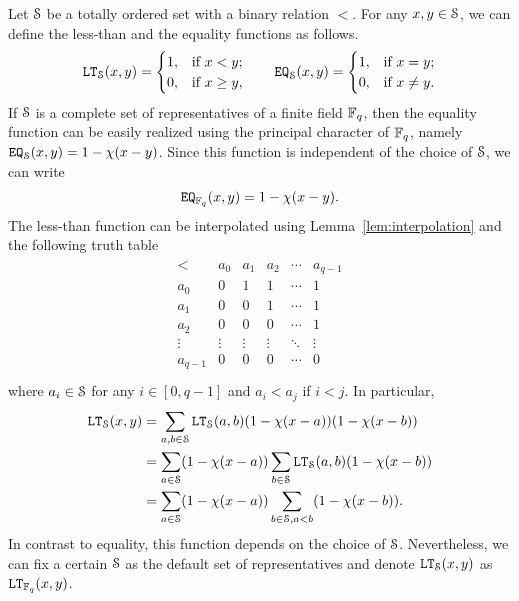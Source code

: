 Let $\S$ be a totally ordered set with a binary relation $<$.
For any $x,y \in \S$, we can define the less-than and the equality functions as follows.
\begin{align*}
  \LT_\S(x,y) = 
  \begin{cases}
    1, & \text{if } x < y; \\
    0, & \text{if } x \ge y, \\
  \end{cases}
  \qquad
  \EQ_\S(x,y) = 
  \begin{cases}
    1, & \text{if } x = y; \\
    0, & \text{if } x \neq y. \\
  \end{cases}
\end{align*}
If $\S$ is a complete set of representatives of a finite field $\F_\fieldcard$, then the equality function can be easily realized using the principal character of $\F_\fieldcard$, namely $\EQ_\S(x,y) = 1 - \princhar(x-y)$.
Since this function is independent of the choice of $\S$, we can write
\begin{align*}
  \EQ_{\F_{\fieldcard}}(x,y) = 1 - \princhar(x-y).
\end{align*}
The less-than function can be interpolated using Lemma~\ref{lem:interpolation} and the following truth table
\begin{align*}
  \begin{array}{c|ccccc}
    < & a_0 & a_1 & a_2 & \cdots & a_{q-1} \\
    \hline
    a_0 & 0 & 1 & 1 & \cdots & 1 \\
    a_1 & 0 & 0 & 1 & \cdots & 1 \\
    a_2 & 0 & 0 & 0 & \cdots & 1 \\
    \vdots & \vdots & \vdots & \vdots & \ddots & \vdots \\
    a_{q-1} & 0 & 0 & 0 & \cdots & 0 \\
  \end{array}
\end{align*}
where $a_i \in \S$ for any $i \in [0,q-1]$ and $a_i < a_j$ if $i < j$.
In particular,
\begin{align*}
  \LT_\S(x,y) &= \sum_{a,b \in \S} \LT_\S(a,b) (1-\princhar(x - a)) (1-\princhar(x - b)) \\
  &= \sum_{a \in \S} (1-\princhar(x - a)) \sum_{b \in \S} \LT_\S(a,b)  (1-\princhar(x - b)) \\
  &= \sum_{a \in \S} (1-\princhar(x - a)) \sum_{b \in \S, a < b} (1-\princhar(x - b)).
\end{align*}
In contrast to equality, this function depends on the choice of $\S$.
Nevertheless, we can fix a certain $\S$ as the default set of representatives and denote $\LT_\S(x,y)$ as $\LT_{\F_\fieldcard}(x,y)$.

